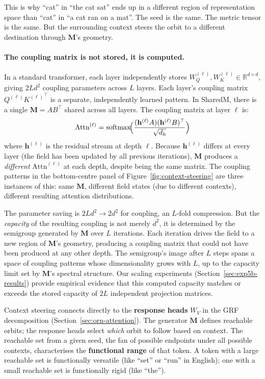 \documentclass[11pt, a4paper]{article}
\newcommand{\M}{\mathbf{M}}
\newcommand{\R}{\mathbb{R}}
\theoremstyle{remark}
\begin{document}
This is why ``cat'' in ``the cat sat'' ends up in a different region of
representation space than ``cat'' in ``a cat ran on a mat''. The seed is
the same. The metric tensor is the same. But the surrounding context
steers the orbit to a different destination through $\M$'s geometry.

\paragraph{The coupling matrix is not stored, it is computed.}
In a standard transformer, each layer independently stores
$W_Q^{(\ell)}, W_K^{(\ell)} \in \R^{d \times d}$, giving $2Ld^2$
coupling parameters across $L$ layers. Each layer's coupling matrix
$Q^{(\ell)}{K^{(\ell)}}^\top$ is a separate, independently learned
pattern. In SharedM, there is a single $\M = AB^\top$ shared across
all layers. The coupling matrix at layer $\ell$ is:
\[
    \text{Attn}^{(\ell)} = \text{softmax}\!\Bigl(
        \frac{(\mathbf{h}^{(\ell)} A)(\mathbf{h}^{(\ell)} B)^\top}{\sqrt{d_h}}
    \Bigr)
\]
where $\mathbf{h}^{(\ell)}$ is the residual stream at depth $\ell$.
Because $\mathbf{h}^{(\ell)}$ differs at every layer (the field has
been updated by all previous iterations), $\M$ produces a
\emph{different} $\text{Attn}^{(\ell)}$ at each depth, despite being
the same matrix. The coupling patterns in the bottom-centre panel of
Figure~\ref{fig:context-steering} are three instances of this: same
$\M$, different field states (due to different contexts), different
resulting attention distributions.

The parameter saving is $2Ld^2 \to 2d^2$ for coupling, an
$L$-fold compression. But the \emph{capacity} of the resulting
coupling is not merely $d^2$, it is determined by the semigroup
generated by $\M$ over $L$ iterations. Each iteration drives the field
to a new region of $\M$'s geometry, producing a coupling matrix that
could not have been produced at any other depth. The semigroup's image
after $L$ steps spans a space of coupling patterns whose dimensionality
grows with $L$, up to the capacity limit set by $\M$'s spectral
structure. Our scaling experiments (Section~\ref{sec:exp5b-results})
provide empirical evidence that this computed capacity matches or
exceeds the stored capacity of $2L$ independent projection matrices.

Context steering connects directly to the \textbf{response heads} $W_V$
in the GRF decomposition (Section~\ref{sec:orn-attention}). The
generator $\M$ defines reachable orbits; the response heads select
\emph{which} orbit to follow based on context. The reachable set from a
given seed, the fan of possible endpoints under all possible
contexts, characterises the \textbf{functional range} of that token.
A token with a large reachable set is functionally versatile (like
``set'' or ``run'' in English); one with a small reachable set is
functionally rigid (like ``the'').
\end{document}
